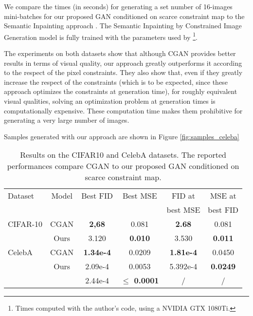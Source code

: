  We compare the times (in seconds) for generating a set number of 16-images mini-batches for our proposed GAN conditioned on scarce constraint map to the Semantic Inpainting approach \citep{Yeh2017}. The  Semantic Inpainting by Constrained Image Generation model is fully trained with the parameters used by \citet{Yeh2017} \footnote{Times computed with the author's code, using a NVIDIA GTX 1080Ti. }.
 
 The experiments on both datasets show that although CGAN  provides better results in terms of visual quality, our approach greatly outperforms it according to the respect of the pixel constraints. They also show that, even if they greatly increase the respect of the constraints (which is to be expected, since these approach optimizes the constraints at generation time), for roughly equivalent visual qualities, solving an optimization problem at generation times is computationally expensive. These computation time makes them prohibitive for generating a very large number of images.
 
  Samples generated with our approach are shown in Figure \ref{fig:samples_celeba}

\begin{table}[t]
	\centering
	\begin{tabular}{l c c c c c }
		\Bigrule
		Dataset &Model           & Best \ac{FID} & Best \ac{MSE} & \ac{FID} at & \ac{MSE} at \\
		&&&&best \ac{MSE} & best \ac{FID} \\
		\bigrule
		CIFAR-10 &CGAN   & \textbf{2,68}  & 0.081  & \textbf{2.68}  & 0.081\\
		&Ours            & 3.120 & \textbf{0.010} & 3.530 & \textbf{0.011} \\    
		\bigrule
		CelebA &CGAN      & \textbf{1.34e-4} & 0.0209 &  \textbf{1.81e-4} & 0.0450\\
		&Ours            & 2.09e-4& 0.0053 & 5.392e-4 & \textbf{0.0249} \\
		&\citet{Yeh2017} & 2.44e-4& \textbf{$\leq$ 0.0001} & / & / \\
	\end{tabular}
	
	\caption[Results on the CIFAR10 and CelebA datasets]{Results on the CIFAR10 and CelebA datasets. The reported performances compare CGAN to our proposed GAN conditioned on scarce constraint map.}
	\label{tab:cifar10}
\end{table}

